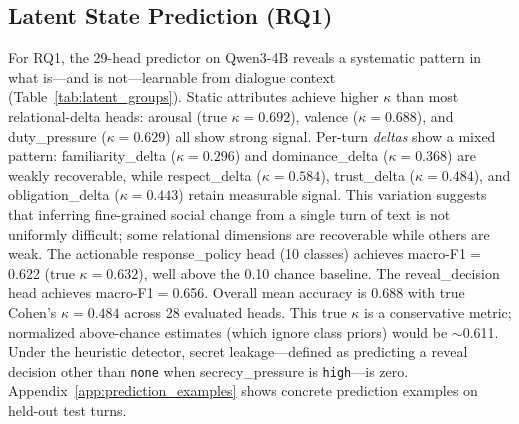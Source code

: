 \documentclass[11pt]{article}
\begin{document}
\subsection{Latent State Prediction (RQ1)}

\begin{table}[t]
\centering
\caption{Per-group latent state prediction metrics (Qwen3-4B, 28 single-label heads evaluated on validation set; dialogue act is multi-label, excluded here). All $\kappa$ values are true Cohen's $\kappa$ computed from confusion matrices.}
\label{tab:latent_groups}
\small
{}
\end{table}

For RQ1, the 29-head predictor on Qwen3-4B reveals a systematic pattern in what is---and is not---learnable from dialogue context (Table~\ref{tab:latent_groups}).
Static attributes achieve higher $\kappa$ than most relational-delta heads: arousal (true $\kappa{=}0.692$), valence ($\kappa{=}0.688$), and duty\_pressure ($\kappa{=}0.629$) all show strong signal.
Per-turn \textit{deltas} show a mixed pattern: familiarity\_delta ($\kappa{=}0.296$) and dominance\_delta ($\kappa{=}0.368$) are weakly recoverable, while respect\_delta ($\kappa{=}0.584$), trust\_delta ($\kappa{=}0.484$), and obligation\_delta ($\kappa{=}0.443$) retain measurable signal.
This variation suggests that inferring fine-grained social change from a single turn of text is not uniformly difficult; some relational dimensions are recoverable while others are weak.
The actionable response\_policy head (10 classes) achieves macro-F1$=$0.622 (true $\kappa{=}0.632$), well above the 0.10 chance baseline.
The reveal\_decision head achieves macro-F1$=$0.656.
Overall mean accuracy is 0.688 with true Cohen's $\kappa{=}0.484$ across 28 evaluated heads.
This true $\kappa$ is a conservative metric; normalized above-chance estimates (which ignore class priors) would be $\sim$0.611.
Under the heuristic detector, secret leakage---defined as predicting a reveal decision other than \texttt{none} when secrecy\_pressure is \texttt{high}---is zero.
Appendix~\ref{app:prediction_examples} shows concrete prediction examples on held-out test turns.
\end{document}
